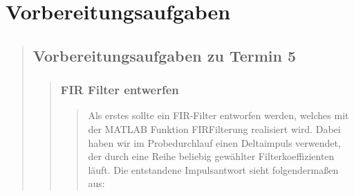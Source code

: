 \section{Vorbereitungsaufgaben}
\begin{quote}
    
    \subsection{Vorbereitungsaufgaben zu Termin 5}
    \begin{quote}
    	
    	\subsubsection{FIR Filter entwerfen}
    	\begin{quote}
		    
			Als erstes sollte ein FIR-Filter entworfen werden, welches mit der MATLAB
			Funktion FIRFilterung realisiert wird. Dabei haben wir im Probedurchlauf einen
			Deltaimpuls verwendet, der durch eine Reihe beliebig gewählter
			Filterkoeffizienten läuft. Die entstandene Impulsantwort sieht folgendermaßen
			aus:
			

\end{quote}
\end{quote}
\end{quote}

